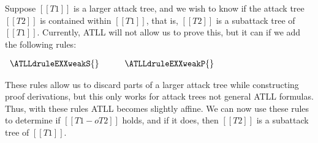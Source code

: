Suppose $[[T1]]$ is a larger attack tree, and we wish to know if the
attack tree $[[T2]]$ is contained within $[[T1]]$, that is, $[[T2]]$
is a subattack tree of $[[T1]]$.  Currently, ATLL will not allow us to
prove this, but it can if we add the following rules:
\begin{center}
  \begin{math}
    \begin{array}{lll}
      \ATLLdruleEXXweakS{} & \quad & \ATLLdruleEXXweakP{}
    \end{array}
  \end{math}
\end{center}
These rules allow us to discard parts of a larger attack tree while
constructing proof derivations, but this only works for attack trees
not general ATLL formulas.  Thus, with these rules ATLL becomes
slightly affine.  We can now use these rules to determine if
$[[T1 -o T2]]$ holds, and if it does, then $[[T2]]$ is a
subattack tree of $[[T1]]$.

